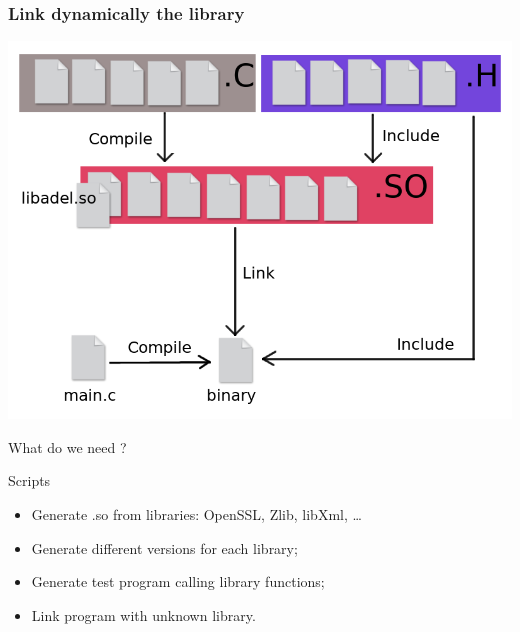 \documentclass[11pt]{beamer}
\begin{document}
\begin{frame}
    \frametitle{Link dynamically the library}
    \includegraphics[scale=0.36]{compil2.png}
\end{frame}

\begin{frame}{What do we need ?}

	\begin{block}{Scripts}
		\begin{itemize}
			\item Generate .so from libraries: OpenSSL, Zlib, libXml, \dots
			\item Generate different versions for each library;
			\item Generate test program calling library functions;
			\item Link program with unknown library.
		\end{itemize}
	\end{block}
	

\end{frame}
\end{document}
